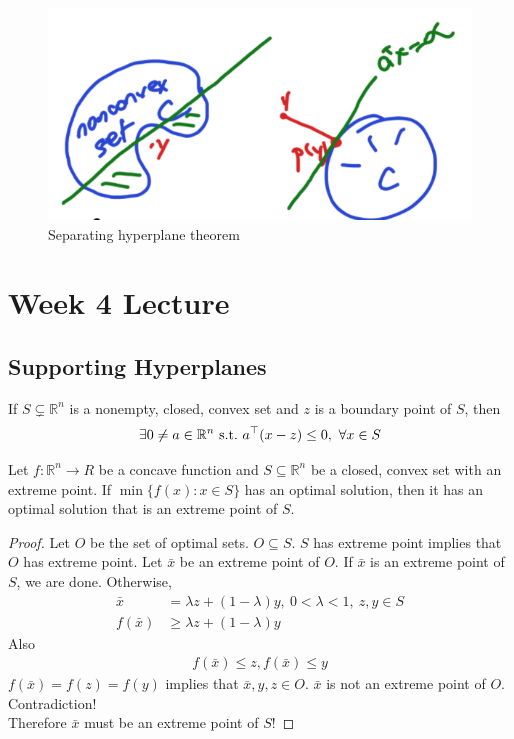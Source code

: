 \documentclass[11pt]{article}
\numberwithin{equation}{section}
\begin{document}
\begin{figure}[ht]
    \centering
    \includegraphics[scale = 0.5]{images/3-th-2.png}
    \caption{Separating hyperplane theorem}
\end{figure}


\newpage
\section{Week 4 Lecture}
\subsection{Supporting Hyperplanes}
\begin{theorem}
    If $S \subsetneq \mathbb{R}^n$ is a nonempty, closed, convex set and $z$ is a boundary point of $S$, then \begin{align*}
        \exists 0 \neq a \in \mathbb{R}^{n}\ \text{s.t.} \ a^\top (x-z) \leq 0, \ \forall x \in S
    \end{align*}
\end{theorem}

\begin{proposition}
    Let $f: \mathbb{R}^n \rightarrow R$ be a concave function and $S \subseteq \mathbb{R}^n$ be a closed, convex set with an extreme point. If $\min\{f(x):x\in S\}$ has an optimal solution, then it has an optimal
solution that is an extreme point of $S$.
\begin{proof}
    Let $O$ be the set of optimal sets. $O \subseteq S$. $S$ has extreme point implies that $O$ has extreme point. Let $\bar{x}$ be an extreme point of $O$. 
    If $\bar{x}$ is an extreme point of $S$, we are done.
    Otherwise, \begin{align*}
        \bar{x} &=\lambda z + (1-\lambda)y, \ 0<\lambda<1,\ z,y\in S \\
        f(\bar{x}) & \geq \lambda z + (1-\lambda)y
    \end{align*} 
    Also \begin{align*}
        f(\bar{x})\leq z,f(\bar{x})\leq y
    \end{align*} 
    $f(\bar{x})=f(z)=f(y) $ implies that $\bar{x},y,z\in O$.
    $\bar{x}$ is not an extreme point of $O$. Contradiction!\\
    Therefore $\bar{x}$ must be an extreme point of $S$!
\end{proof}
\end{proposition}
\end{document}
